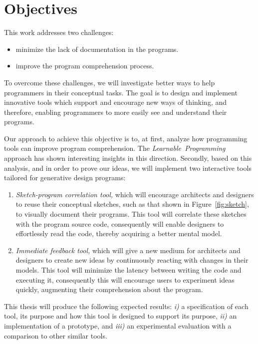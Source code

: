 
% 
% 

\section{Objectives}

This work addresses two challenges:

\begin{itemize}
\item minimize the lack of documentation in the programs.
\item improve the program comprehension process.
\end{itemize}

To overcome these challenges, we will investigate better ways to help programmers in their conceptual tasks. The goal is to design and implement innovative tools which support and encourage new ways of thinking, and therefore, enabling programmers to more easily see and understand their programs.

Our approach to achieve this objective is to, at first, analyze how programming tools can improve program comprehension. The \textit{Learnable~Programming}~\cite{learnableProg,inventingPrin} approach has shown interesting insights in this direction. Secondly, based on this analysis, and in order to prove our ideas, we will implement two interactive tools tailored for generative design programs: 

\begin{enumerate}
\item \textit{Sketch-program correlation tool,} which will encourage architects and designers to reuse their conceptual sketches, such as that shown in Figure~\ref{fig:sketch}, to visually document their programs. This tool will correlate these sketches with the program source code, consequently will enable designers to effortlessly read the code, thereby acquiring a better mental model.

\item \textit{Immediate feedback tool,} which will give a new medium for architects and designers to create new ideas by continuously reacting with changes in their models. This tool will minimize the latency between writing the code and executing it, consequently this will encourage users to experiment ideas quickly, augmenting their comprehension about the program.
\end{enumerate}

This thesis will produce the following expected results: \textit{i)} a specification of each tool, its purpose and how this tool is designed to support its purpose, \textit{ii)} an implementation of a prototype, and \textit{iii)} an experimental evaluation with a comparison to other similar tools.
